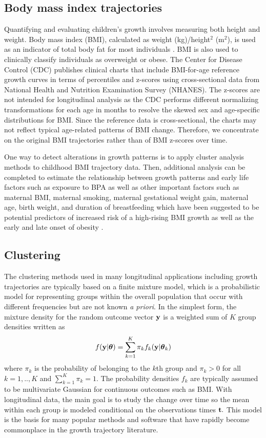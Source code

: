 \subsection{Body mass index trajectories}
Quantifying and evaluating children's growth involves measuring both height and weight. Body mass index (BMI), calculated as weight (kg)/height$^{2}$ (m$^{2}$), is used as an indicator of total body fat for most individuals \cite{roche1981}. BMI is also used to clinically classify individuals as overweight or obese. The Center for Disease Control (CDC) publishes clinical charts that include BMI-for-age reference growth curves in terms of percentiles and z-scores using cross-sectional data from National Health and Nutrition Examination Survey (NHANES). The z-scores are not intended for longitudinal analysis as the CDC performs different normalizing transformations for each age in months to resolve the skewed sex and age-specific distributions for BMI. Since the reference data is cross-sectional, the charts may not reflect typical age-related patterns of BMI change. Therefore, we concentrate on the original BMI trajectories rather than of BMI z-scores over time.

One way to detect alterations in growth patterns is to apply cluster analysis methods to childhood BMI trajectory data. Then, additional analysis can be completed to estimate the relationship between growth patterns and early life factors such as exposure to BPA as well as other important factors such as maternal BMI, maternal smoking, maternal gestational weight gain, maternal age, birth weight, and duration of breastfeeding which have been suggested to be potential predictors of increased risk of a high-rising BMI growth as well as the early and late onset of obesity \cite{pryor2011,carter2012,li2007}.

\subsection{Clustering}
The clustering methods used in many longitudinal applications including growth trajectories are typically based on a finite mixture model, which is a probabilistic model for representing groups within the overall population that occur with different frequencies but are not known \emph{a priori}. In the simplest form, the mixture density for the random outcome vector $\mathbf y$ is a weighted sum of $K$ group densities written as
$$f(\mathbf y|\boldsymbol\theta) = \sum^{K}_{k=1}\pi_{k}f_{k}(\mathbf y|\boldsymbol\theta_{k})$$
where $\pi_{k}$ is the probability of belonging to the $k$th group and $\pi_{k}>0$ for all $k=1,..,K$ and $\sum^{K}_{k=1}\pi_{k}=1$. The probability densities $f_{k}$ are typically assumed to be multivariate Gaussian for continuous outcomes such as BMI. With longitudinal data, the main goal is to study the change over time so the mean within each group is modeled conditional on the observations times $\mathbf t.$  This model is the basis for many popular methods and software that have rapidly become commonplace in the growth trajectory literature.


